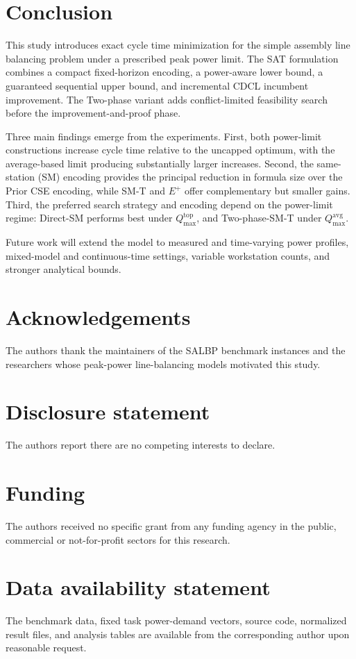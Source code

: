 \documentclass[]{interact}
\theoremstyle{plain}
\theoremstyle{definition}
\theoremstyle{remark}
\begin{document}
\section{Conclusion}

This study introduces exact cycle time minimization for the simple assembly line balancing problem under a prescribed peak power limit. The SAT formulation combines a compact fixed-horizon encoding, a power-aware lower bound, a guaranteed sequential upper bound, and incremental CDCL incumbent improvement. The Two-phase variant adds conflict-limited feasibility search before the improvement-and-proof phase.

Three main findings emerge from the experiments. First, both power-limit constructions increase cycle time relative to the uncapped optimum, with the average-based limit producing substantially larger increases. Second, the same-station (SM) encoding provides the principal reduction in formula size over the Prior CSE encoding, while SM-T and $E^+$ offer complementary but smaller gains. Third, the preferred search strategy and encoding depend on the power-limit regime: Direct-SM performs best under $Q_{\max}^{\mathrm{top}}$, and Two-phase-SM-T under $Q_{\max}^{\mathrm{avg}}$.

Future work will extend the model to measured and time-varying power profiles, mixed-model and continuous-time settings, variable workstation counts, and stronger analytical bounds.

\section*{Acknowledgements}

The authors thank the maintainers of the SALBP benchmark instances and the researchers whose peak-power line-balancing models motivated this study.

\section*{Disclosure statement}

The authors report there are no competing interests to declare.

\section*{Funding}

The authors received no specific grant from any funding agency in the public, commercial or not-for-profit sectors for this research.

\section*{Data availability statement}

The benchmark data, fixed task power-demand vectors, source code, normalized result files, and analysis tables are available from the corresponding author upon reasonable request.



\end{document}
